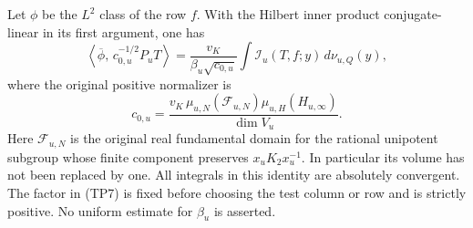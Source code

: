 \begin{theorem}
\label{thm:actual-poincare-bessel-pairing}
Let $\phi$ be the $L^2$ class of the row $f$. With the Hilbert
inner product conjugate-linear in its first argument, one has
\[
 \left\langle\overline\phi,\,c_{0,u}^{-1/2}P_uT\right\rangle
   =\frac{v_K}{\beta_u\sqrt{c_{0,u}}}
             \int\mathcal I_u(T,f;y)\,d\nu_{u,Q}(y),
 \tag{TP7}
\]
where the original positive normalizer is
\[
 c_{0,u}=\frac{v_K\,\mu_{u,N}(\mathcal F_{u,N})
                         \mu_{u,H}(H_{u,\infty})}{\dim V_u}.
\]
Here $\mathcal F_{u,N}$ is the original real fundamental domain for
the rational unipotent subgroup whose finite component preserves
$x_uK_2x_u^{-1}$. In particular its volume has not been replaced by
one.
All integrals in this identity are absolutely convergent. The factor
in (TP7) is fixed before choosing the test column or row and is
strictly positive. No uniform estimate for $\beta_u$ is asserted.
\end{theorem}

